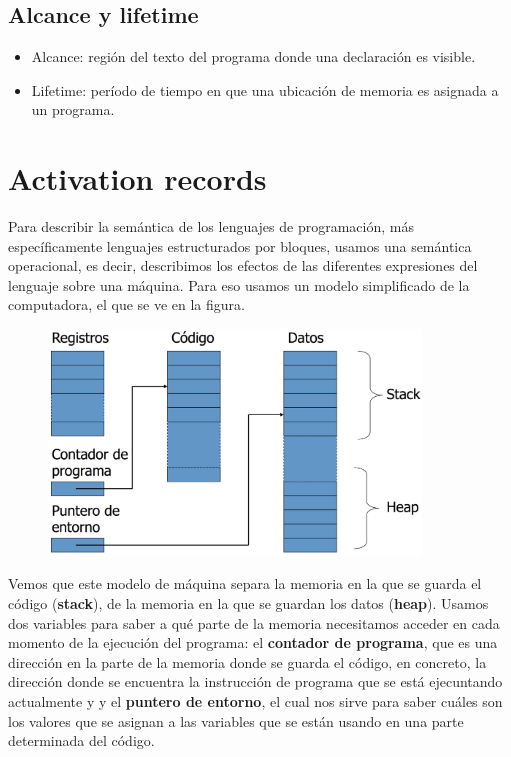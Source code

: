 \documentclass[10pt,a4paper]{report}
\begin{document}
\subsection{Alcance y lifetime}
\begin{itemize}
\item Alcance: región del texto del programa donde una declaración es 
visible.
\item Lifetime: período de tiempo en que una ubicación de memoria es asignada a un programa.
\end{itemize}

\section{Activation records}

\par Para describir la semántica de los lenguajes de programación, más 
específicamente lenguajes estructurados por bloques, usamos una 
semántica operacional, es decir, describimos los efectos de las diferentes 
expresiones del lenguaje sobre una máquina. Para eso usamos un modelo 
simplificado de la computadora, el que se ve en la figura.

\begin{center} 
    \includegraphics[width=12cm, height=6cm]{arecord.png}
\end{center}

\par Vemos que este modelo de máquina separa la memoria en la que se 
guarda el código (\textbf{stack}), de la memoria en la que se guardan los 
datos (\textbf{heap}). Usamos dos variables para saber a qué parte de la 
memoria necesitamos acceder en cada momento de la ejecución del 
programa: el \textbf{contador de programa}, que es una dirección en la 
parte de la memoria donde se guarda el código, en concreto, la dirección 
donde se encuentra la instrucción de programa que se está ejecuntando 
actualmente y y el \textbf{puntero de entorno}, el cual nos sirve para 
saber cuáles son los valores que se asignan a las variables que se están 
usando en una parte determinada del código. 
\end{document}

